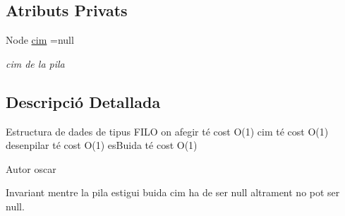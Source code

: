 \subsection*{Atributs Privats}
\begin{DoxyCompactItemize}
\item 
\hypertarget{classlogica_1_1historic__moviments_1_1_pila_3_01_t_01_4_aadeb0cd8bcf7f880f2bd1b878d3d238b}{Node \hyperlink{classlogica_1_1historic__moviments_1_1_pila_3_01_t_01_4_aadeb0cd8bcf7f880f2bd1b878d3d238b}{cim} =null}\label{classlogica_1_1historic__moviments_1_1_pila_3_01_t_01_4_aadeb0cd8bcf7f880f2bd1b878d3d238b}

\begin{DoxyCompactList}\small\item\em cim de la pila \end{DoxyCompactList}\end{DoxyCompactItemize}


\subsection{Descripció Detallada}
Estructura de dades de tipus F\+I\+L\+O on afegir té cost O(1) cim té cost O(1) desenpilar té cost O(1) es\+Buida té cost O(1) 

\begin{DoxyAuthor}{Autor}
oscar 
\end{DoxyAuthor}
\begin{DoxyInvariant}{Invariant}
mentre la pila estigui buida cim ha de ser null altrament no pot ser null. 
\end{DoxyInvariant}


